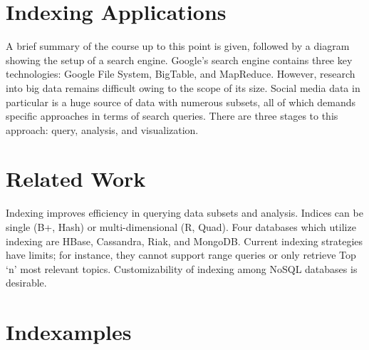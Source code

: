 
\section{Indexing Applications}

A brief summary of the course up to this point is given, followed by a
diagram showing the setup of a search engine. Google's search engine
contains three key technologies: Google File System, BigTable, and
MapReduce. However, research into big data remains difficult owing to
the scope of its size. Social media data in particular is a huge source
of data with numerous subsets, all of which demands specific approaches
in terms of search queries. There are three stages to this approach:
query, analysis, and visualization.




\section{Related Work}

Indexing improves efficiency in querying data subsets and analysis.
Indices can be single (B+, Hash) or multi-dimensional (R, Quad). Four
databases which utilize indexing are HBase, Cassandra, Riak, and
MongoDB. Current indexing strategies have limits; for instance, they
cannot support range queries or only retrieve Top `n' most relevant
topics. Customizability of indexing among NoSQL databases is desirable.




\section{Indexamples}


